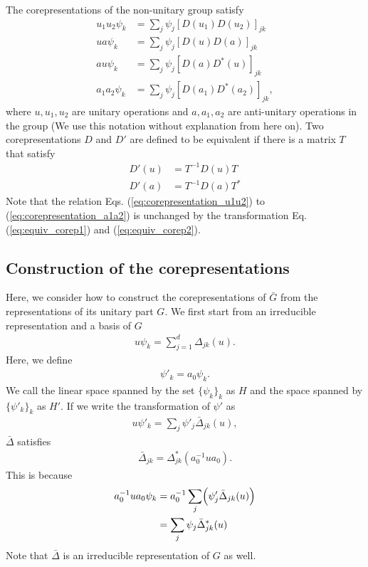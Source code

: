 \documentclass{article}
\theoremstyle{definition}
\begin{document}
The corepresentations of the non-unitary group satisfy
\begin{align}
  u_1 u_2 \psi_k &= \sum_j \psi_j [D(u_1) D(u_2)]_{jk}
  \label{eq:corepresentation_u1u2}
  \\
  u a \psi_k &= \sum_j \psi_j [D(u) D(a)]_{jk}
  \label{eq:corepresentation_ua}
  \\
  au \psi_k &= \sum_j \psi_j [D(a) D^*(u)]_{jk}
  \label{eq:corepresentation_au}
  \\
  a_1 a_2 \psi_k &= \sum_j \psi_j [D(a_1) D^*(a_2)]_{jk},
  \label{eq:corepresentation_a1a2}
\end{align}
where $u, u_1, u_2$ are unitary operations and $a, a_1, a_2$ are anti-unitary operations in the group (We use this notation without explanation from here on).
Two corepresentations $D$ and $D'$ are defined to be equivalent if there is a matrix $T$ that satisfy
\begin{align}
  D'(u) &= T^{-1} D(u) T
  \label{eq:equiv_corep1}
  \\
  D'(a) &= T^{-1} D(a) T^*
  \label{eq:equiv_corep2}
\end{align}
Note that the relation Eqs. (\ref{eq:corepresentation_u1u2}) to (\ref{eq:corepresentation_a1a2}) is unchanged by the transformation Eq. (\ref{eq:equiv_corep1}) and (\ref{eq:equiv_corep2}).

\subsection{Construction of the corepresentations}
Here, we consider how to construct the corepresentations of $\bar{G}$ from the representations of its unitary part $G$.
We first start from an irreducible representation and a basis of $G$
\begin{align}
  u \psi_k = \sum_{j = 1}^d \Delta_{jk}(u).
\end{align}
Here, we define 
\begin{align}
  \psi'_k = a_0 \psi_k.
\end{align}
We call the linear space spanned by the set $\{\psi_k\}_k$ as $H$ and the space spanned by $\{\psi'_k\}_k$ as $H'$.
If we write the transformation of $\psi'$ as
\begin{align}
  u \psi'_k = \sum_j \psi'_j \bar{\Delta}_{jk}(u),
\end{align}
$\bar{\Delta}$ satisfies
\begin{align}
  \bar{\Delta}_{jk} = \Delta^*_{jk} (a_0^{-1} u a_0).
\end{align}
This is because
\begin{align}
  a_0^{-1} u a_0 \psi_k 
  &= 
  a_0^{-1}
  \sum_j
  \Bigl(
    \psi'_j \bar{\Delta}_{jk}(u)  
  \Bigr)
  \nonumber
  \\&=
  \sum_j \psi_j \bar{\Delta}^*_{jk}(u)  
\end{align}
Note that $\bar{\Delta}$ is an irreducible representation of $G$ as well.
\end{document}
